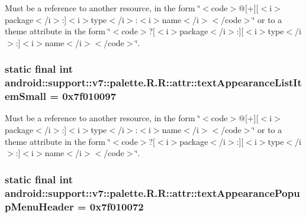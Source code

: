 Must be a reference to another resource, in the form \char`\"{}$<$code$>$@\mbox{[}+\mbox{]}\mbox{[}$<$i$>$package$<$/i$>$:\mbox{]}$<$i$>$type$<$/i$>$:$<$i$>$name$<$/i$>$$<$/code$>$\char`\"{} or to a theme attribute in the form \char`\"{}$<$code$>$?\mbox{[}$<$i$>$package$<$/i$>$:\mbox{]}\mbox{[}$<$i$>$type$<$/i$>$:\mbox{]}$<$i$>$name$<$/i$>$$<$/code$>$\char`\"{}. \hypertarget{classandroid_1_1support_1_1v7_1_1palette_1_1_r_1_1attr_1c38fd8065424d9e1267ba75d93ebc55}{
\subsubsection[{textAppearanceListItemSmall}]{\setlength{\rightskip}{0pt plus 5cm}static final int android::support::v7::palette.R.R::attr::textAppearanceListItemSmall = 0x7f010097}}
\label{classandroid_1_1support_1_1v7_1_1palette_1_1_r_1_1attr_1c38fd8065424d9e1267ba75d93ebc55}


Must be a reference to another resource, in the form \char`\"{}$<$code$>$@\mbox{[}+\mbox{]}\mbox{[}$<$i$>$package$<$/i$>$:\mbox{]}$<$i$>$type$<$/i$>$:$<$i$>$name$<$/i$>$$<$/code$>$\char`\"{} or to a theme attribute in the form \char`\"{}$<$code$>$?\mbox{[}$<$i$>$package$<$/i$>$:\mbox{]}\mbox{[}$<$i$>$type$<$/i$>$:\mbox{]}$<$i$>$name$<$/i$>$$<$/code$>$\char`\"{}. \hypertarget{classandroid_1_1support_1_1v7_1_1palette_1_1_r_1_1attr_d376d437506a05e8d71a3a87b9b5fa4c}{
\subsubsection[{textAppearancePopupMenuHeader}]{\setlength{\rightskip}{0pt plus 5cm}static final int android::support::v7::palette.R.R::attr::textAppearancePopupMenuHeader = 0x7f010072}}
\label{classandroid_1_1support_1_1v7_1_1palette_1_1_r_1_1attr_d376d437506a05e8d71a3a87b9b5fa4c}


